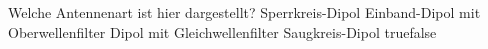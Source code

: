     {Welche Antennenart ist hier dargestellt?  }
    {Sperrkreis-Dipol}
    {Einband-Dipol mit Oberwellenfilter}
    {Dipol mit Gleichwellenfilter}
    {Saugkreis-Dipol}
    {true}{false}